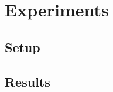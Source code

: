 \chapter{Experiments}\label{ch:exp}

\section{Setup}\label{sec:exp_setup}

\section{Results}\label{sec:exp_results}
